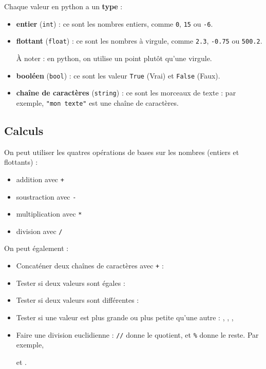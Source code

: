 \documentclass[
	classe=$2^{de}$,
	headerTitle=Fiche\space récapitulative
]
{informatique}
\begin{document}
Chaque valeur en python a un \textbf{type} :
\begin{itemize}
	\item \textbf{entier} (\texttt{int}) : ce sont les nombres entiers, comme \texttt{0}, \texttt{15} ou \texttt{-6}.
	\item \textbf{flottant} (\texttt{float}) : ce sont les nombres à virgule, comme \texttt{2.3}, \texttt{-0.75} ou \texttt{500.2}.

	      À noter : en python, on utilise un point plutôt qu'une virgule.
	\item \textbf{booléen} (\texttt{bool}) : ce sont les valeur \texttt{True} (Vrai) et \texttt{False} (Faux).
	\item \textbf{chaîne de caractères} (\texttt{string}) : ce sont les morceaux de texte : par exemple, \texttt{"mon texte"} est une chaîne de caractères.
\end{itemize}

\subsection*{Calculs}

On peut utiliser les quatres opérations de bases sur les nombres (entiers et flottants) :

\begin{multicols}{2}
	\begin{itemize}
		\item addition avec \texttt{+}
		\item soustraction avec \texttt{-}
		\item multiplication avec \texttt{*}
		\item division avec \texttt{/}
	\end{itemize}
\end{multicols}

On peut également :
\begin{itemize}
	\item Concaténer deux chaînes de caractères avec \texttt{+} : 
	\item Tester si deux valeurs sont égales : 
	\item Tester si deux valeurs sont différentes : 
	\item Tester si une valeur est plus grande ou plus petite qu'une autre :
	      , , , 
	\item Faire une division euclidienne : \texttt{//} donne le quotient, et \texttt{\%} donne le reste. Par exemple,

	       et .
\end{itemize}
\end{document}
